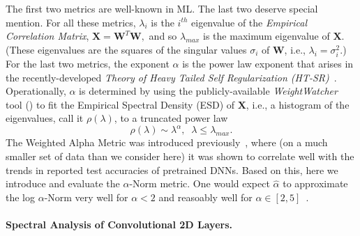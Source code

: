 The first two metrics are well-known in ML.
The last two deserve special mention.
For all these metrics, $\lambda_{i}$ is the $i^{th}$ eigenvalue of the \emph{Empirical Correlation Matrix},
$ %
\mathbf{X}=\mathbf{W}^{T}\mathbf{W} ,
$ %
and so $\lambda_{max}$ is the maximum eigenvalue of $\mathbf{X}$. 
(These eigenvalues are the squares of the singular values $\sigma_{i}$ of $\mathbf{W}$, i.e., $\lambda_{i}=\sigma^{2}_{i}$.)
For the last two metrics, the exponent $\alpha$ is the power law exponent that arises in the recently-developed \emph{Theory of Heavy Tailed Self Regularization (HT-SR)}~\cite{MM18_TR, MM19_HTSR_ICML, MM20_SDM}.
Operationally, $\alpha$ is determined by using the publicly-available \emph{WeightWatcher} tool (\cite{weightwatcher_package}) to fit the Empirical Spectral Density (ESD) of $\mathbf{X}$, i.e., a histogram of the eigenvalues, call it $\rho(\lambda)$, to a truncated power law
\begin{equation}
\rho(\lambda)\sim\lambda^{\alpha},\;\;\lambda\le\lambda_{max}  .
\end{equation}
The Weighted Alpha Metric was introduced previously~\cite{MM20_SDM}, where (on a much smaller set of data than we consider here) it was shown to correlate well with the trends in reported test accuracies of pretrained DNNs.
Based on this, here we introduce and evaluate the $\alpha$-Norm metric.
One would expect $\hat{\alpha}$ to approximate the log $\alpha$-Norm very well for $\alpha < 2$ and reasoably well for $\alpha\in[2,5]$~\cite{MM20_unpub_work}.




\paragraph{Spectral Analysis of Convolutional 2D Layers.}

